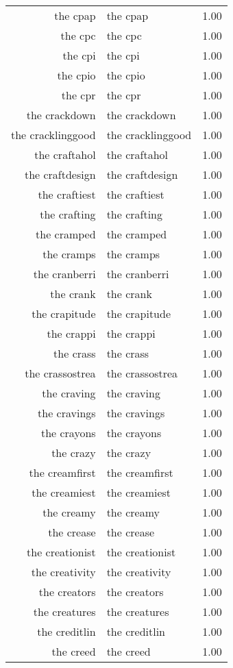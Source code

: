 \begin{table}[ht]
\begin{tabular}{rlr}
  the cpap & the cpap & 1.00 \\ 
  the cpc & the cpc & 1.00 \\ 
  the cpi & the cpi & 1.00 \\ 
  the cpio & the cpio & 1.00 \\ 
  the cpr & the cpr & 1.00 \\ 
  the crackdown & the crackdown & 1.00 \\ 
  the cracklinggood & the cracklinggood & 1.00 \\ 
  the craftahol & the craftahol & 1.00 \\ 
  the craftdesign & the craftdesign & 1.00 \\ 
  the craftiest & the craftiest & 1.00 \\ 
  the crafting & the crafting & 1.00 \\ 
  the cramped & the cramped & 1.00 \\ 
  the cramps & the cramps & 1.00 \\ 
  the cranberri & the cranberri & 1.00 \\ 
  the crank & the crank & 1.00 \\ 
  the crapitude & the crapitude & 1.00 \\ 
  the crappi & the crappi & 1.00 \\ 
  the crass & the crass & 1.00 \\ 
  the crassostrea & the crassostrea & 1.00 \\ 
  the craving & the craving & 1.00 \\ 
  the cravings & the cravings & 1.00 \\ 
  the crayons & the crayons & 1.00 \\ 
  the crazy & the crazy & 1.00 \\ 
  the creamfirst & the creamfirst & 1.00 \\ 
  the creamiest & the creamiest & 1.00 \\ 
  the creamy & the creamy & 1.00 \\ 
  the crease & the crease & 1.00 \\ 
  the creationist & the creationist & 1.00 \\ 
  the creativity & the creativity & 1.00 \\ 
  the creators & the creators & 1.00 \\ 
  the creatures & the creatures & 1.00 \\ 
  the creditlin & the creditlin & 1.00 \\ 
  the creed & the creed & 1.00 \\ 

\end{tabular}
\end{table}
